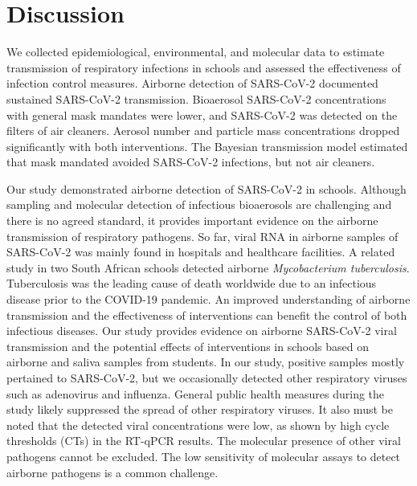 \documentclass[fleqn,11pt]{wlscirep}
\begin{document}
{\newpage

\section{Discussion}

We collected epidemiological, environmental, and molecular data to estimate transmission of respiratory infections in schools and assessed the effectiveness of infection control measures. Airborne detection of SARS-CoV-2 documented sustained SARS-CoV-2 transmission. Bioaerosol SARS-CoV-2 concentrations with general mask mandates were lower, and SARS-CoV-2 was detected on the filters of air cleaners. Aerosol number and particle mass concentrations dropped significantly with both interventions. The Bayesian transmission model estimated that mask mandated avoided SARS-CoV-2 infections, but not air cleaners.

Our study demonstrated airborne detection of SARS-CoV-2 in schools. Although sampling and molecular detection of infectious bioaerosols are challenging and there is no agreed standard\cite{Santarpia2020,Morris2022,Stockwell2019}, it provides important evidence on the airborne transmission of respiratory pathogens. So far, viral RNA in airborne samples of SARS-CoV-2 was mainly found in hospitals and healthcare facilities\cite{Shen2021}. A related study in two South African schools detected airborne \emph{Mycobacterium tuberculosis}\cite{Bunyasi2022}. Tuberculosis was the leading cause of death worldwide due to an infectious disease prior to the COVID-19 pandemic. An improved understanding of airborne transmission and the effectiveness of interventions can benefit the control of both infectious diseases\cite{Rieder2021}. Our study provides evidence on airborne SARS-CoV-2 viral transmission and the potential effects of interventions in schools based on airborne and saliva samples from students. In our study, positive samples mostly pertained to SARS-CoV-2, but we occasionally detected other respiratory viruses such as adenovirus and influenza. General public health measures during the study likely suppressed the spread of other respiratory viruses. It also must be noted that the detected viral concentrations were low, as shown by high cycle thresholds (CTs) in the RT-qPCR results. The molecular presence of other viral pathogens cannot be excluded. The low sensitivity of molecular assays to detect airborne pathogens is a common challenge\cite{Morris2022,Stockwell2019}.

}
\end{document}
